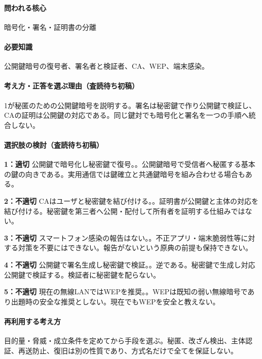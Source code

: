 \paragraph{問われる核心} 暗号化・署名・証明書の分離

\paragraph{必要知識} 公開鍵暗号の復号者、署名者と検証者、CA、WEP、端末感染。

\paragraph{考え方・正答を選ぶ理由（査読待ち初稿）} 1が秘匿のための公開鍵暗号を説明する。署名は秘密鍵で作り公開鍵で検証し、CAの証明は公開鍵の対応である。同じ鍵対でも暗号化と署名を一つの手順へ統合しない。

\paragraph{選択肢の検討（査読待ち初稿）}\mbox{}\par

\noindent\textbf{1：適切} 公開鍵で暗号化し秘密鍵で復号。。公開鍵暗号で受信者へ秘匿する基本の鍵の向きである。実用通信では鍵確立と共通鍵暗号を組み合わせる場合もある。\par

\noindent\textbf{2：不適切} CAはユーザと秘密鍵を結び付ける。。証明書が公開鍵と主体の対応を結び付ける。秘密鍵を第三者へ公開・配付して所有者を証明する仕組みではない。\par

\noindent\textbf{3：不適切} スマートフォン感染の報告はない。。不正アプリ・端末脆弱性等に対する対策を不要にはできない。報告がないという原典の前提も保持できない。\par

\noindent\textbf{4：不適切} 公開鍵で署名生成し秘密鍵で検証。。逆である。秘密鍵で生成し対応公開鍵で検証する。検証者に秘密鍵を配らない。\par

\noindent\textbf{5：不適切} 現在の無線LANではWEPを推奨。。WEPは既知の弱い無線暗号であり出題時の安全な推奨としない。現在でもWEPを安全と教えない。\par

\paragraph{再利用する考え方} 目的量・脅威・成立条件を定めてから手段を選ぶ。秘匿、改ざん検出、主体認証、再送防止、復旧は別の性質であり、方式名だけで全てを保証しない。

